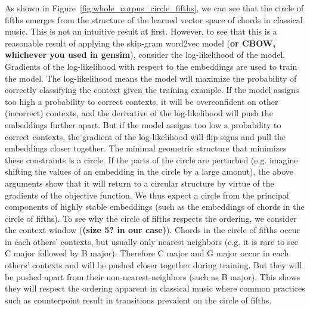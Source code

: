 
As shown in Figure~\ref{fig:whole_corpus_circle_fifths}, we can see that the circle of fifths emerges from the structure of the learned vector space of chords in classical music.
This is not an intuitive result at first.
However, to see that this is a reasonable result of applying the skip-gram word2vec model (\textbf{or CBOW, whichever you used in gensim}), consider the log-likelihood of the model.
Gradients of the log-likelihood with respect to the embeddings are used to train the model.
The log-likelihood means the model will maximize the probability of correctly classifying the context given the training example.
If the model assigns too high a probability to correct contexts, it will be overconfident on other (incorrect) contexts, and the derivative of the log-likelihood will push the embeddings further apart.
But if the model assigns too low a probability to correct contexts, the gradient of the log-likelihood will flip signs and pull the embeddings closer together.
The minimal geometric structure that minimizes these constraints is a circle. If the parts of the circle are perturbed (e.g. imagine shifting the values of an embedding in the circle by a large amonut), the above arguments show that it will return to a circular structure by virtue of the gradients of the objective function.
We thus expect a circle from the principal components of highly stable embeddings (such as the embeddings of chords in the circle of fifths).
To see why the circle of fifths respects the ordering, we consider the context window (\textbf{(size 5? in our case)}).
Chords in the circle of fifths occur in each others' contexts, but usually only nearest neighbors (e.g. it is rare to see C major followed by B major).
Therefore C major and G major occur in each others' contexts and will be pushed closer together during training.
But they will be pushed apart from their non-nearest-neighbors (such as B major).
This shows they will respect the ordering apparent in classical music where common practices such as counterpoint result in transitions prevalent on the circle of fifths.